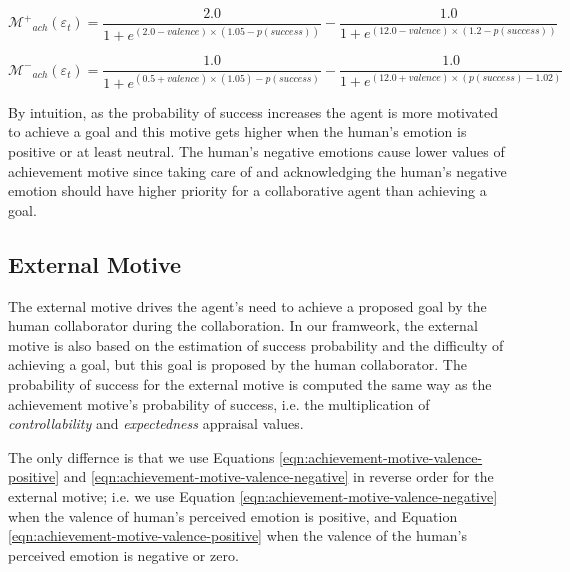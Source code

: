 \documentclass[12pt]{report}
\begin{document}
\begin{equation}
\mathcal{M^{+}}_{ach}(\varepsilon_t)=
\frac{2.0}{1+e^{(2.0-valence)\times(1.05-p(success))}}
- \frac{1.0}{1+e^{(12.0-valence)\times(1.2-p(success))}}
\label{eqn:achievement-motive-valence-positive}
\end{equation}

\begin{equation}
\mathcal{M^{-}}_{ach}(\varepsilon_t)=
\frac{1.0}{1+e^{(0.5+valence)\times(1.05)-p(success)}}
- \frac{1.0}{1+e^{(12.0+valence)\times(p(success)-1.02)}}
\label{eqn:achievement-motive-valence-negative}
\end{equation}

By intuition, as the probability of success increases the agent is more
motivated to achieve a goal and this motive gets higher when the human's
emotion is positive or at least neutral. The human's negative emotions cause
lower values of achievement motive since taking care of and acknowledging the
human's negative emotion should have higher priority for a collaborative agent
than achieving a goal.

\subsection{External Motive}
The external motive drives the agent's need to achieve a proposed goal by the
human collaborator during the collaboration. In our framweork, the external
motive is also based on the estimation of success probability and the difficulty
of achieving a goal, but this goal is proposed by the human collaborator. The
probability of success for the external motive is computed the same way as the
achievement motive's probability of success, i.e. the multiplication of
\textit{controllability} and \textit{expectedness} appraisal values.

The only differnce is that we use Equations
\ref{eqn:achievement-motive-valence-positive} and
\ref{eqn:achievement-motive-valence-negative} in reverse order for the external
motive; i.e. we use Equation \ref{eqn:achievement-motive-valence-negative}
when the valence of human's perceived emotion is positive, and Equation
\ref{eqn:achievement-motive-valence-positive} when the valence of the human's
perceived emotion is negative or zero.
\end{document}
